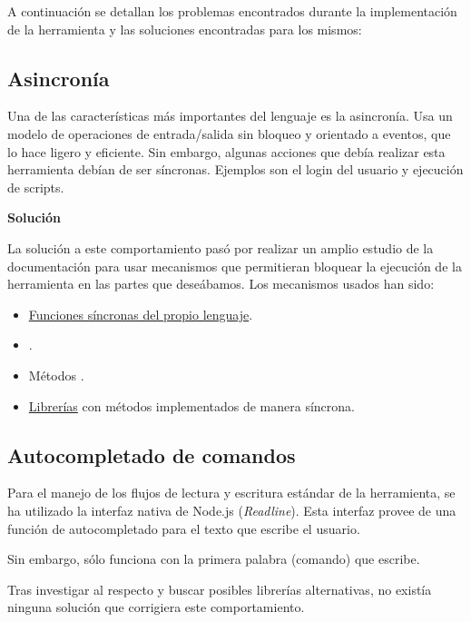 A continuación se detallan los problemas encontrados durante la implementación de la herramienta y las soluciones encontradas para los mismos:

\subsection{Asincronía}
\label{subsec:3.3.1}

Una de las características más importantes del lenguaje \ceis{\ref{apend1:js}} es la asincronía. Usa un modelo de operaciones de entrada/salida sin bloqueo y orientado a eventos, que lo hace ligero y eficiente. Sin embargo, algunas acciones que debía realizar esta herramienta debían de ser síncronas. Ejemplos son el login del usuario y ejecución de scripts.
\bigskip

{\normalsize {\bfseries Solución}}
\bigskip

La solución a este comportamiento pasó por realizar un amplio estudio de la documentación para usar mecanismos que permitieran bloquear la ejecución de la herramienta en las partes que deseábamos. Los mecanismos usados han sido:

\begin{itemize}
	\item \underline{Funciones síncronas del propio lenguaje}.
	\item \ceit{\ref{apend1:promesa}}.
	\item Métodos \ceit{\ref{apend1:async-await}}.
	\item \underline{Librerías} con métodos implementados de manera síncrona.
\end{itemize}

\subsection{Autocompletado de comandos}
\label{subsec:3.3.2}

Para el manejo de los flujos de lectura y escritura estándar de la herramienta, se ha utilizado la interfaz nativa de Node.js ({\it Readline}). Esta interfaz provee de una función de autocompletado para el texto que escribe el usuario.
\bigskip

Sin embargo, sólo funciona con la primera palabra (comando) que escribe. 
\bigskip

Tras investigar al respecto y buscar posibles librerías alternativas, no existía ninguna solución que corrigiera este comportamiento.
\bigskip

